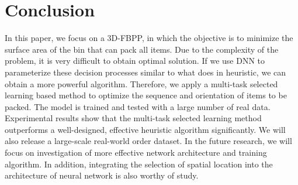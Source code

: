 \section{Conclusion}
\label{sec:conclusion}

In this paper, we focus on a 3D-FBPP, 
in which the objective is to minimize the surface area of the bin 
that can pack all items. Due to the complexity of the problem, 
it is very difficult to obtain optimal solution. If we use DNN to parameterize these decision processes similar to what does in heuristic, we can obtain a more powerful algorithm. Therefore, we apply a multi-task 
selected learning based method to optimize the sequence and orientation of 
items to be packed. The model is trained and tested with a large number of real data. 
Experimental results show that the multi-task selected learning method outperforms a well-designed, effective heuristic algorithm significantly. We will also release a large-scale real-world order
dataset. In the future research, we will focus on investigation of more effective network architecture and training algorithm. In addition, integrating the selection of spatial location into the architecture of neural network is also worthy of study.
